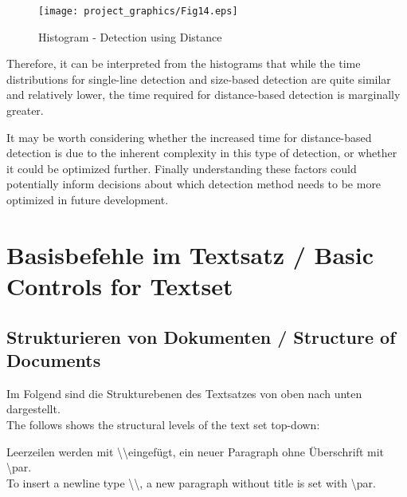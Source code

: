 \documentclass[]{iat}
\begin{document}
\par
\FloatBarrier
\begin{figure}[h]
	\texttt{[image: project\_graphics/Fig14.eps]}
	\caption{Histogram - Detection using Distance  }
	\label{fig:fig14}
\end{figure}
\par
Therefore, it can be interpreted from the histograms that while the time distributions for single-line detection and size-based detection are quite similar and relatively lower, the time required for distance-based detection is marginally greater.
\par
It may be worth considering whether the increased time for distance-based detection is due to the inherent complexity in this type of detection, or whether it could be optimized further. Finally understanding these factors could potentially inform decisions about which detection method needs to be more optimized in future development. 


\chapter{Basisbefehle im Textsatz / Basic Controls for Textset}
\section{Strukturieren von Dokumenten / Structure of Documents}
Im Folgend sind die Strukturebenen des Textsatzes von oben nach unten dargestellt.\\
The follows shows the structural levels of the text set top-down:

Leerzeilen werden mit \textbackslash\textbackslash\space eingefügt, ein neuer Paragraph ohne Überschrift mit \textbackslash par.\\
To insert a newline type \textbackslash\textbackslash, a new paragraph without title is set with \textbackslash par.
\end{document}
